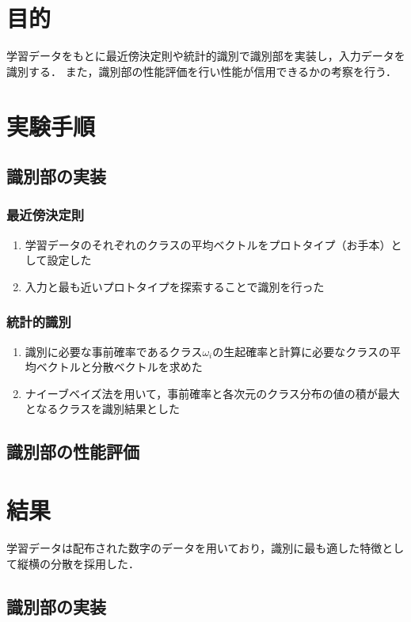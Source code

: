 \documentclass{jlreq}
\numberwithin{equation}{section}
\begin{document}
\tableofcontents
\clearpage

\section{目的}
学習データをもとに最近傍決定則や統計的識別で識別部を実装し，入力データを識別する．
また，識別部の性能評価を行い性能が信用できるかの考察を行う．

\section{実験手順}
\subsection{識別部の実装}
\subsubsection*{最近傍決定則}
\begin{enumerate}
  \item 学習データのそれぞれのクラスの平均ベクトルをプロトタイプ（お手本）として設定した
  \item 入力と最も近いプロトタイプを探索することで識別を行った
\end{enumerate}

\subsubsection*{統計的識別}
\begin{enumerate}
  \item 識別に必要な事前確率であるクラス$\omega_i$の生起確率と計算に必要なクラスの平均ベクトルと分散ベクトルを求めた
  \item ナイーブベイズ法を用いて，事前確率と各次元のクラス分布の値の積が最大となるクラスを識別結果とした
\end{enumerate}

\subsection{識別部の性能評価}

\section{結果}
学習データは配布された数字のデータを用いており，識別に最も適した特徴として縦横の分散を採用した．
\subsection{識別部の実装}
\end{document}
